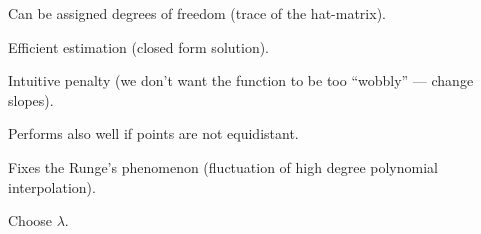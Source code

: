 		\begin{my_pros_cons_table}{
				\item Can be assigned degrees of freedom (trace of the hat-matrix).
				\item Efficient estimation (closed form solution).
				\item Intuitive penalty (we don't want the function to be too ``wobbly'' --- change slopes).
				\item Performs also well if points are not equidistant.
				\item Fixes the Runge's phenomenon (fluctuation of high degree polynomial interpolation).
			}{
				\item Choose $\lambda$.
			}
		\end{my_pros_cons_table}



